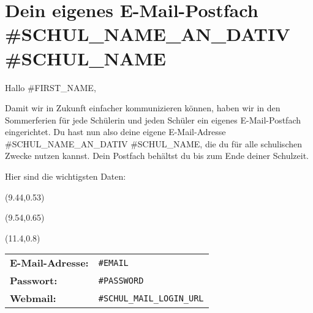 \clearpage


\vspace*{-8mm}

\section*{Dein eigenes E-Mail-Postfach #{SCHUL_NAME_AN_DATIV} #{SCHUL_NAME}}

Hallo #{FIRST_NAME},

Damit wir in Zukunft einfacher kommunizieren können, haben wir in den Sommerferien für jede Schülerin und jeden Schüler ein eigenes E-Mail-Postfach eingerichtet. Du hast nun also deine eigene E-Mail-Adresse #{SCHUL_NAME_AN_DATIV} #{SCHUL_NAME}, die du für alle schulischen Zwecke nutzen kannst. Dein Postfach behältst du bis zum Ende deiner Schulzeit.

Hier sind die wichtigsten Daten:

\begin{textblock}{4}(9.44,0.53)
\begin{turn}{-5}

\end{turn}
\end{textblock}

\begin{textblock}{4}(9.54,0.65)
\begin{turn}{-5}
\end{turn}
\vspace*{10mm}
\end{textblock}

\begin{textblock}{4}(11.4,0.8)
\scalebox{0.12}{}
\end{textblock}

\vspace*{1mm}
\begin{tabularx}{\textwidth}{p{3cm}X}
\hline
{\bf E-Mail-Adresse:} & {\tt #{EMAIL}} \\
{\bf Passwort:} & {\tt #{PASSWORD}} \\
{\bf Webmail:} & {\tt #{SCHUL_MAIL_LOGIN_URL}} \\
\end{tabularx}
\begin{tabularx}{0.75\textwidth}{p{3cm}X}
\hline
\end{tabularx}

\vspace*{5mm}

